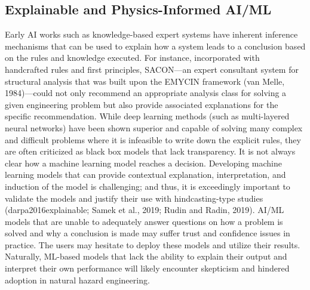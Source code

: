 \subsection{Explainable and Physics-Informed AI/ML}

Early AI works such as knowledge-based expert systems have inherent inference mechanisms that can be used to explain how a system leads to a conclusion based on the rules and knowledge executed. For instance, incorporated with handcrafted rules and first principles, SACON\citep{bennett1978}—an expert consultant system for structural analysis that was built upon the EMYCIN framework (van Melle, 1984)—could not only recommend an appropriate analysis class for solving a given engineering problem but also provide associated explanations for the specific recommendation. While deep learning methods (such as multi-layered neural networks) have been shown superior and capable of solving many complex and difficult problems where it is infeasible to write down the explicit rules, they are often criticized as black box models that lack transparency. It is not always clear how a machine learning model reaches a decision. Developing machine learning models that can provide contextual explanation, interpretation, and induction of the model is challenging; and thus, it is exceedingly important to validate the models and justify their use with hindcasting-type studies (darpa2016explainable; Samek et al., 2019; Rudin and Radin, 2019). AI/ML models that are unable to adequately answer questions on how a problem is solved and why a conclusion is made may suffer trust and confidence issues in practice. The users may hesitate to deploy these models and utilize their results. Naturally, ML-based models that lack the ability to explain their output and interpret their own performance will likely encounter skepticism and hindered adoption in natural hazard engineering. 


